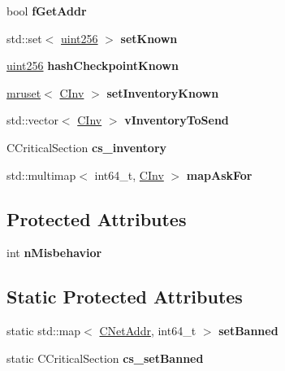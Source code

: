 \begin{DoxyCompactItemize}
bool {\bfseries f\+Get\+Addr}
\item 
\mbox{\label{class_c_node_ab1b30fa8e48005752f6b0bcf43eca478}} 
std\+::set$<$ \mbox{\hyperlink{classuint256}{uint256}} $>$ {\bfseries set\+Known}
\item 
\mbox{\label{class_c_node_af1b7e1316a44a8ed4995413366ed6b8a}} 
\mbox{\hyperlink{classuint256}{uint256}} {\bfseries hash\+Checkpoint\+Known}
\item 
\mbox{\label{class_c_node_ae15aa9a971040800c26bc87b1250220f}} 
\mbox{\hyperlink{classmruset}{mruset}}$<$ \mbox{\hyperlink{class_c_inv}{C\+Inv}} $>$ {\bfseries set\+Inventory\+Known}
\item 
\mbox{\label{class_c_node_abcd24c9478bc1ab5ba6de6b369080cec}} 
std\+::vector$<$ \mbox{\hyperlink{class_c_inv}{C\+Inv}} $>$ {\bfseries v\+Inventory\+To\+Send}
\item 
\mbox{\label{class_c_node_a1e8b0784cc82f33edc2dc4e2834d1ff0}} 
C\+Critical\+Section {\bfseries cs\+\_\+inventory}
\item 
\mbox{\label{class_c_node_a7593dfbd76c34a81169e3fb2aa0e0cf7}} 
std\+::multimap$<$ int64\+\_\+t, \mbox{\hyperlink{class_c_inv}{C\+Inv}} $>$ {\bfseries map\+Ask\+For}
\end{DoxyCompactItemize}
\subsection*{Protected Attributes}
\begin{DoxyCompactItemize}
\item 
\mbox{\label{class_c_node_a442ac1857129bccaea4642d23d94ee58}} 
int {\bfseries n\+Misbehavior}
\end{DoxyCompactItemize}
\subsection*{Static Protected Attributes}
\begin{DoxyCompactItemize}
\item 
\mbox{\label{class_c_node_adf22d1873c1012ab3edb8a52253b203e}} 
static std\+::map$<$ \mbox{\hyperlink{class_c_net_addr}{C\+Net\+Addr}}, int64\+\_\+t $>$ {\bfseries set\+Banned}
\item 
\mbox{\label{class_c_node_a9ff9a6f07a280aa07d77713ae43d383a}} 
static C\+Critical\+Section {\bfseries cs\+\_\+set\+Banned}
\end{DoxyCompactItemize}


